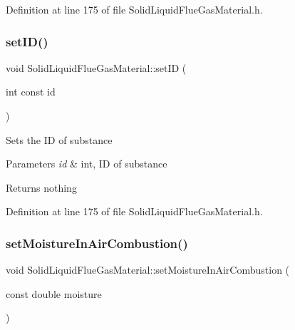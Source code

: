 Definition at line 175 of file Solid\+Liquid\+Flue\+Gas\+Material.\+h.

\mbox{\label{class_solid_liquid_flue_gas_material_a6046d06703bd496745121b62eab4f40f}} 
\subsubsection{\texorpdfstring{set\+I\+D()}{setID()}\hspace{0.1cm}{\footnotesize\ttfamily [3/3]}}
{\footnotesize\ttfamily void Solid\+Liquid\+Flue\+Gas\+Material\+::set\+ID (\begin{DoxyParamCaption}\item[{int const}]{id }\end{DoxyParamCaption})\hspace{0.3cm}{\ttfamily [inline]}}

Sets the ID of substance 
\begin{DoxyParams}{Parameters}
{\em id} & int, ID of substance \\
\hline
\end{DoxyParams}
\begin{DoxyReturn}{Returns}
nothing 
\end{DoxyReturn}


Definition at line 175 of file Solid\+Liquid\+Flue\+Gas\+Material.\+h.

\mbox{\label{class_solid_liquid_flue_gas_material_a1a5f1bd3008e78cce62edb8aca642284}} 
\subsubsection{\texorpdfstring{set\+Moisture\+In\+Air\+Combustion()}{setMoistureInAirCombustion()}\hspace{0.1cm}{\footnotesize\ttfamily [1/3]}}
{\footnotesize\ttfamily void Solid\+Liquid\+Flue\+Gas\+Material\+::set\+Moisture\+In\+Air\+Combustion (\begin{DoxyParamCaption}\item[{const double}]{moisture }\end{DoxyParamCaption})\hspace{0.3cm}{\ttfamily [inline]}}

